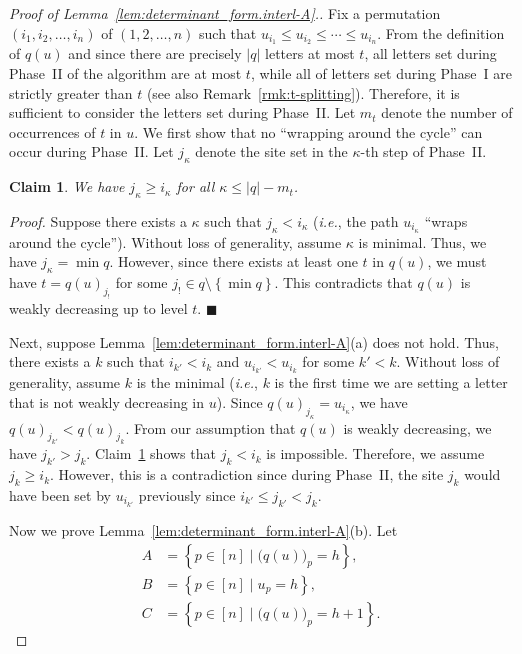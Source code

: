 \documentclass[reqno]{amsart}
\newcommand{\0}{\phantom{c}}
\newenvironment{subproof}{\textit{Proof.} }{\hfill$\blacksquare$ \medskip}
\newcommand{\set}[1]{\left\{ #1 \right\}}
\newcommand{\abs}[1]{\left| #1 \right|}
\newcommand{\tup}[1]{\left( #1 \right)}
\newcommand{\ive}[1]{\left[ #1 \right]}
\theoremstyle{plain}
\newtheorem{claim}[thm]{Claim}
\theoremstyle{definition}
\numberwithin{equation}{section}
\begin{document}
\begin{proof}[Proof of Lemma~\ref{lem:determinant_form.interl-A}.]
Fix a permutation $\tup{i_1, i_2, \dotsc, i_n}$ of $\tup{1, 2, \dotsc, n}$ such that $u_{i_1}\leq u_{i_2}\leq \cdots \leq u_{i_n}$.
From the definition of $q(u)$ and since there are precisely $\abs{q}$ letters at most $t$, all letters set during Phase~II of the algorithm are at most $t$, while all of letters set during Phase~I are strictly greater than $t$ (see also Remark~\ref{rmk:t-splitting}).
Therefore, it is sufficient to consider the letters set during Phase~II.
Let $m_t$ denote the number of occurrences of $t$ in $u$.
We first show that no ``wrapping around the cycle'' can occur during Phase~II.
Let $j_{\kappa}$ denote the site set in the $\kappa$-th step of Phase~II.

\begin{claim}
\label{claim:no_wrapping}
We have $j_{\kappa} \geq i_{\kappa}$ for all $\kappa \leq \abs{q} - m_t$.
\end{claim}

\begin{subproof}
Suppose there exists a $\kappa$ such that $j_{\kappa} < i_{\kappa}$ (\textit{i.e.}, the path $u_{i_{\kappa}}$ ``wraps around the cycle'').
Without loss of generality, assume $\kappa$ is minimal.
Thus, we have $j_{\kappa} = \min q$.
However, since there exists at least one $t$ in $q(u)$, we must have $t = q(u)_{j_!}$ for some $j_! \in q \setminus \set{\min q}$.
This contradicts that $q(u)$ is weakly decreasing up to level $t$.
\end{subproof}

Next, suppose Lemma~\ref{lem:determinant_form.interl-A}(a) does not hold.
Thus, there exists a $k$ such that $i_{k'} < i_k$ and $u_{i_{k'}} < u_{i_k}$ for some $k' < k$.
Without loss of generality, assume $k$ is the minimal (\textit{i.e.}, $k$ is the first time we are setting a letter that is not weakly decreasing in $u$).
Since $q(u)_{j_{\kappa}} = u_{i_{\kappa}}$, we have $q(u)_{j_{k'}} < q(u)_{j_k}$.
From our assumption that $q(u)$ is weakly decreasing, we have $j_{k'} > j_k$.
Claim~\ref{claim:no_wrapping} shows that $j_k < i_k$ is impossible.
Therefore, we assume $j_k \geq i_k$.
However, this is a contradiction since during Phase~II, the site $j_k$ would have been set by $u_{i_{k'}}$ previously since $i_{k'} \leq j_{k'} < j_k$.

Now we prove Lemma~\ref{lem:determinant_form.interl-A}(b).
Let
\begin{align*}
A & = \set{ p \in \ive{n} \mid \bigl( q(u) \bigr)_p = h },
\\
B & = \set{ p \in \ive{n} \mid u_p = h },
\\
C & = \set{ p \in \ive{n} \mid \bigl( q(u) \bigr)_p = h+1 }.
\end{align*}


\end{proof}
\end{document}
